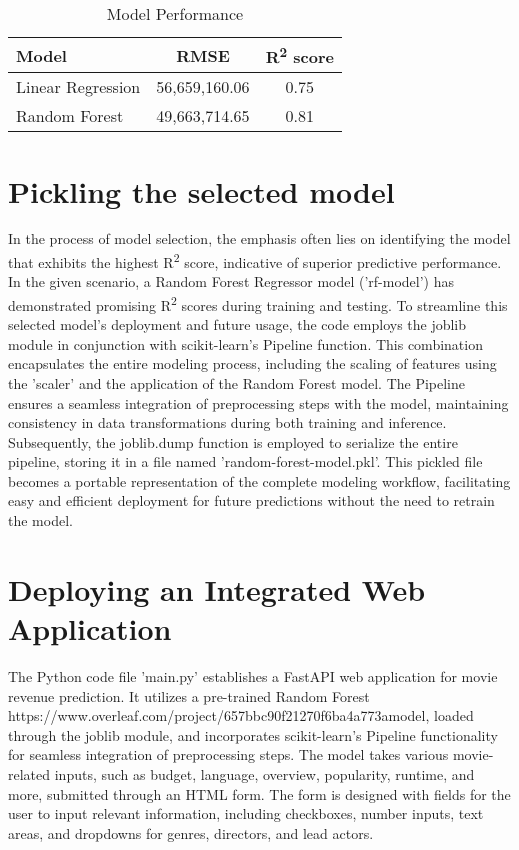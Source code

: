\documentclass[conference]{IEEEtran}
\begin{document}
\begin{table}[htbp]
    \centering
    \caption{Model Performance}
    \begin{tabular}{lcc}
    \toprule
    \textbf{Model} & \textbf{RMSE} & \textbf{R\textsuperscript{2} score} \\
    \midrule
    Linear Regression & 56,659,160.06 & 0.75 \\
    Random Forest & 49,663,714.65 & 0.81 \\
    \bottomrule
    \end{tabular}
\end{table}

\section{Pickling the selected model}

In the process of model selection, the emphasis often lies on identifying the model that exhibits the highest R\textsuperscript{2} score, indicative of superior predictive performance. In the given scenario, a Random Forest Regressor model ('rf-model') has demonstrated promising R\textsuperscript{2} scores during training and testing. To streamline this selected model's deployment and future usage, the code employs the joblib module in conjunction with scikit-learn's Pipeline function. This combination encapsulates the entire modeling process, including the scaling of features using the 'scaler' and the application of the Random Forest model. The Pipeline ensures a seamless integration of preprocessing steps with the model, maintaining consistency in data transformations during both training and inference. Subsequently, the joblib.dump function is employed to serialize the entire pipeline, storing it in a file named 'random-forest-model.pkl'. This pickled file becomes a portable representation of the complete modeling workflow, facilitating easy and efficient deployment for future predictions without the need to retrain the model.

\section{Deploying an Integrated Web Application}

The Python code file 'main.py' establishes a FastAPI web application for movie revenue prediction. It utilizes a pre-trained Random Forest https://www.overleaf.com/project/657bbc90f21270f6ba4a773amodel, loaded through the joblib module, and incorporates scikit-learn's Pipeline functionality for seamless integration of preprocessing steps. The model takes various movie-related inputs, such as budget, language, overview, popularity, runtime, and more, submitted through an HTML form. The form is designed with fields for the user to input relevant information, including checkboxes, number inputs, text areas, and dropdowns for genres, directors, and lead actors.\\
\end{document}
